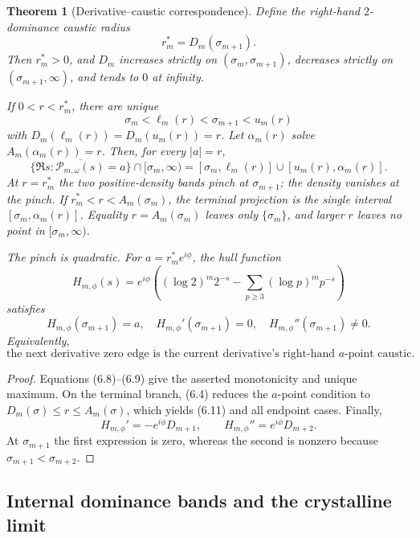 \documentclass[11pt]{article}
\newtheorem{theorem}{Theorem}[section]
\theoremstyle{definition}
\theoremstyle{remark}
\newcommand{\cP}{\mathcal P}
\begin{document}
\begin{theorem}[Derivative--caustic correspondence]
\label{thm:caustic}
Define the right-hand $2$-dominance caustic radius
\[
 \boxed{r_m^*=D_m(\sigma_{m+1}).}
\tag{6.10}
\]
Then $r_m^*>0$, and $D_m$ increases strictly on
$(\sigma_m,\sigma_{m+1})$, decreases strictly on
$(\sigma_{m+1},\infty)$, and tends to $0$ at infinity.

If $0<r<r_m^*$, there are unique
\[
 \sigma_m<\ell_m(r)<\sigma_{m+1}<u_m(r)
\]
with $D_m(\ell_m(r))=D_m(u_m(r))=r$.  Let $\alpha_m(r)$ solve
$A_m(\alpha_m(r))=r$.  Then, for every $|a|=r$,
\[
 \boxed{
 \overline{\{\Re s:\cP_{m,\omega}(s)=a\}}
 \cap[\sigma_m,\infty)
 = [\sigma_m,\ell_m(r)]\cup[u_m(r),\alpha_m(r)].
 }
\tag{6.11}
\]
At $r=r_m^*$ the two positive-density bands pinch at $\sigma_{m+1}$; the density
vanishes at the pinch.  If
$r_m^*<r<A_m(\sigma_m)$, the terminal projection is the single interval
$[\sigma_m,\alpha_m(r)]$.  Equality $r=A_m(\sigma_m)$ leaves only
$\{\sigma_m\}$, and larger $r$ leaves no point in $[\sigma_m,\infty)$.

The pinch is quadratic.  For $a=r_m^*e^{i\phi}$, the hull function
\[
 H_{m,\phi}(s)=e^{i\phi}\left((\log2)^m2^{-s}
 -\sum_{p\ge3}(\log p)^mp^{-s}\right)
\]
satisfies
\[
 H_{m,\phi}(\sigma_{m+1})=a,
 \quad H_{m,\phi}'(\sigma_{m+1})=0,
 \quad H_{m,\phi}''(\sigma_{m+1})\neq 0.
\tag{6.12}
\]
Equivalently,
\[
 \boxed{
 \text{the next derivative zero edge is the current derivative's
 right-hand $a$-point caustic.}
 }
\tag{6.13}
\]
\end{theorem}

\begin{proof}
Equations (6.8)--(6.9) give the asserted monotonicity and unique maximum.  On the
terminal branch, (6.4) reduces the $a$-point condition to
$D_m(\sigma)\le r\le A_m(\sigma)$, which yields (6.11) and all endpoint cases.
Finally,
\[
 H_{m,\phi}'=-e^{i\phi}D_{m+1},
 \qquad
 H_{m,\phi}''=e^{i\phi}D_{m+2}.
\]
At $\sigma_{m+1}$ the first expression is zero, whereas the second is nonzero because
$\sigma_{m+1}<\sigma_{m+2}$.
\end{proof}

\subsection{Internal dominance bands and the crystalline limit}
\label{subsec:internal-bands}
\end{document}
